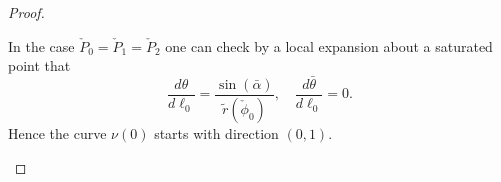 \documentclass[reqno]{amsart}
\theoremstyle{definition} \newtheorem{definition}{Definition}[section]
\theoremstyle{definition} \newtheorem{remark}[definition]{Remark}
\theoremstyle{plain} \newtheorem{lemma}[definition]{Lemma}
\theoremstyle{plain} \newtheorem{proposition}[definition]{Proposition}
\theoremstyle{plain} \newtheorem{theorem}[definition]{Theorem}
\theoremstyle{plain} \newtheorem{corollary}[definition]{Corollary}
\theoremstyle{definition} \newtheorem{example}[definition]{Example}
\theoremstyle{plain} \newtheorem{claim}[clai]{Claim}
\theoremstyle{definition} \newtheorem{assumption}[definition]{Assumption}
\theoremstyle{definition} \newtheorem{observation}[definition]{Observation}
\newcommand{\1}{\mathbbm 1}
\numberwithin{equation}{section} %
\theoremstyle{plain} \newtheorem*{theorem*}{Theorem}
\theoremstyle{plain} \newtheorem{mthm}[maintheorem]{Main Theorem}
\theoremstyle{plain} \newtheorem*{mthm*}{Main Theorem}
\theoremstyle{plain} \newtheorem*{conjecture*}{Conjecture}
\theoremstyle{plain} \newtheorem{conjecture}[definition]{Conjecture}
\theoremstyle{plain} \newtheorem*{problem*}{Problem}
\begin{document}
\begin{proof}
\begin{description}
 In the case $\check P_0 = \check P_1 = \check P_2$ one can check by a local expansion about a saturated point that
 \begin{equation*}
 \frac{d\theta}{d\ell_0} = \frac{\sin(\bar \alpha)}{\tilde r(\check \phi_0)}, \quad \frac{d\bar \theta}{d\ell_0} = 0.
 \end{equation*}
 Hence the curve $\nu(0)$ starts with direction $(0,1)$.
 
% 
 
 
 


\end{description}
\end{proof}
\end{document}
